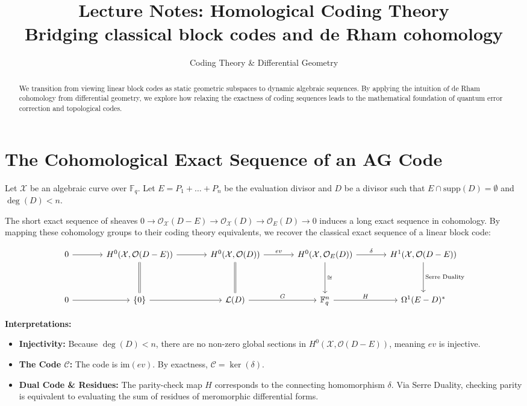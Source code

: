 \documentclass[11pt, a4paper]{article}
\title{\textbf{Lecture Notes: Homological Coding Theory} \\ \large Bridging classical block codes and de Rham cohomology}
\author{Coding Theory \& Differential Geometry}
\date{}
\newcommand{\F}{\mathbb{F}}
\newcommand{\X}{\mathcal{X}}
\newcommand{\cO}{\mathcal{O}}
\begin{document}
	
	\maketitle
	
	\begin{abstract}
		We transition from viewing linear block codes as static geometric subspaces to dynamic algebraic sequences. By applying the intuition of de Rham cohomology from differential geometry, we explore how relaxing the exactness of coding sequences leads to the mathematical foundation of quantum error correction and topological codes.
	\end{abstract}
	
	\section*{The Cohomological Exact Sequence of an AG Code}
	
	Let $\X$ be an algebraic curve over $\F_q$. Let $E = P_1 + \dots + P_n$ be the evaluation divisor and $D$ be a divisor such that $E \cap \text{supp}(D) = \emptyset$ and $\deg(D) < n$. 
	
	The short exact sequence of sheaves $0 \to \cO_{\X}(D - E) \to \cO_{\X}(D) \to \cO_E(D) \to 0$ induces a long exact sequence in cohomology. By mapping these cohomology groups to their coding theory equivalents, we recover the classical exact sequence of a linear block code:
	
	\[
	\begin{tikzcd}[row sep=huge, column sep=large]
		0 \arrow[r] & 
		H^0(\X, \cO(D-E)) \arrow[r] \arrow[d, equal] & 
		H^0(\X, \cO(D)) \arrow[r, "ev"] \arrow[d, equal] & 
		H^0(\X, \cO_E(D)) \arrow[r, "\delta"] \arrow[d, "\cong"] & 
		H^1(\X, \cO(D-E)) \arrow[d, "\text{Serre Duality}"] \\
		0 \arrow[r] & 
		\{0\} \arrow[r] & 
		\mathcal{L}(D) \arrow[r, "G"] & 
		\F_q^n \arrow[r, "H"] & 
		\Omega^1(E-D)^*
	\end{tikzcd}
	\]
	
	\vspace{1em}
	\noindent \textbf{Interpretations:}
	\begin{itemize}
		\item \textbf{Injectivity:} Because $\deg(D) < n$, there are no non-zero global sections in $H^0(\X, \cO(D-E))$, meaning $ev$ is injective.
		\item \textbf{The Code $\mathcal{C}$:} The code is $\text{im}(ev)$. By exactness, $\mathcal{C} = \ker(\delta)$.
		\item \textbf{Dual Code \& Residues:} The parity-check map $H$ corresponds to the connecting homomorphism $\delta$. Via Serre Duality, checking parity is equivalent to evaluating the sum of residues of meromorphic differential forms.
	\end{itemize}
	
\end{document}
